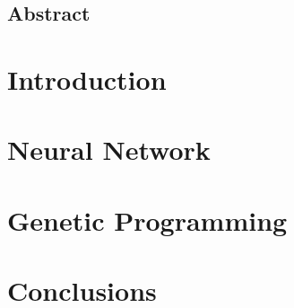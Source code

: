 \documentclass{report}
\begin{document}

\thispagestyle{empty}



\phantom{}
\newpage


\section*{\huge Abstract}



\phantom{}
\newpage


\tableofcontents

\phantom{}
\newpage


\pagestyle{fancy}
\fancyhf{}
\fancyhead[L]{\nouppercase{\rightmark\hfill\leftmark}}
\fancyfoot[C]{\thepage}
\renewcommand{\headrulewidth}{0.5pt}



\chapter{Introduction}


\phantom{}
\newpage


\chapter{Neural Network}


\chapter{Genetic Programming}


\chapter{Conclusions}



\phantom{}
\newpage
\end{document}
